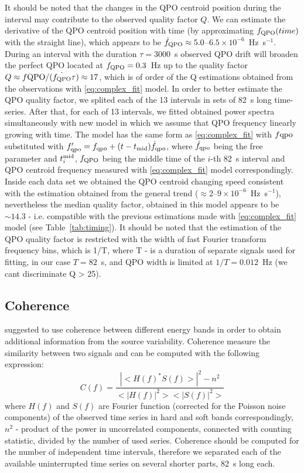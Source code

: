 \documentclass[a4paper,fleqn,usenatbib]{mnras}
\begin{document}
It should be noted that the changes in the QPO centroid position during the interval may contribute to the observed quality factor $Q$.
We can estimate the derivative of the QPO centroid position with time (by approximating $f_{\rm QPO}(time)$ with the straight line), which appears to be $\dot{f}_{\rm QPO} \approx 5.0$--$6.5\times10^{-6}$~Hz~s$^{-1}$. 
During an interval with the duration $\tau = 3000$~s observed QPO drift will broaden the perfect QPO located at $f_{\rm QPO}=0.3$~Hz up to the quality factor $Q \approx f{\rm QPO}/(\dot{f_{\rm QPO}}\tau) \approx 17$, which is of order of the Q estimations obtained from the observations with \ref{eq:complex_fit} model.
In order to better estimate the QPO quality factor, we splited each of the 13 intervals in sets of 82~s long time-series. 
After that, for each of 13 intervals, we fitted obtained power spectra simultaneously with new model in which we assume that QPO frequency linearly growing with time. 
The model has the same form as \ref{eq:complex_fit} with $f{\rm qpo}$ substituted with $f_{\rm qpo}' = f_{\rm qpo} + (t - t_{\rm mid})\dot{f}_{\rm qpo}$, where $\dot{f}_{\rm qpo}$ being the free parameter and $t_{i}^{\rm mid}$, $f_{\rm QPO}$ being the middle time of the $i$-th 82~s interval and QPO centroid frequency measured with \ref{eq:complex_fit} model correspondingly.
Inside each data set we obtained the QPO centroid changing speed consistent with the estimation obtained from the general trend ($\approx 2$--$9\times10^{-6}$~Hz~s$^{-1}$), nevertheless the median quality factor, obtained in this model appears to be $\sim14.3$ - i.e. compatible with the previous estimations made with \ref{eq:complex_fit} model (see Table~\ref{tab:timing}). 
It should be noted that the estimation of the QPO quality factor is restricted with the width of fast Fourier transform frequency bins, which is 1/T, where T - is a duration of separate signals used for fitting, in our case $T=82$~s, and QPO width is limited at $1/T = 0.012$~Hz (we cant discriminate Q > 25).

\subsection{Coherence}

\citep{1997ApJ...474L..43V} suggested to use coherence between different energy bands in order to obtain additional information from the source variability. 
Coherence measure the similarity between two signals and can be computed with the following expression:
\begin{equation}
    C(f) = \frac{|<H(f)^*S(f)>|^2 - n^2}{<|H(f)|^2><|S(f)|^2>}
    \label{eq:nowak_coh}
\end{equation}
where $H(f)$ and $S(f)$ are Fourier function (corrected for the Poisson noise components) of the observed time series in hard and soft bands correspondingly, 
$n^2$ - product of the power in uncorrelated components, connected with counting statistic, divided by the number of used series. 
Coherence should be computed for the number of independent time intervals, therefore we separated each of the available uninterrupted time series on several shorter parts, 82~s long each.  
\end{document}
